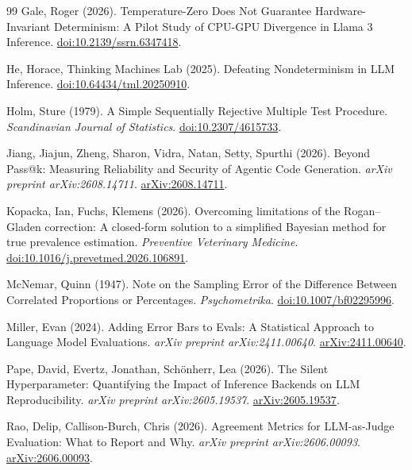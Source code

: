 \documentclass[11pt,letterpaper]{article}
\begin{document}
\begin{thebibliography}{99}
Gale, Roger (2026).
\newblock Temperature-Zero Does Not Guarantee Hardware-Invariant Determinism: A Pilot Study of CPU-GPU Divergence in Llama 3 Inference.
\newblock \href{https://doi.org/10.2139/ssrn.6347418}{doi:10.2139/ssrn.6347418}.

He, Horace, Thinking Machines Lab (2025).
\newblock Defeating Nondeterminism in LLM Inference.
\newblock \href{https://doi.org/10.64434/tml.20250910}{doi:10.64434/tml.20250910}.

Holm, Sture (1979).
\newblock A Simple Sequentially Rejective Multiple Test Procedure.
\newblock \emph{Scandinavian Journal of Statistics}.
\newblock \href{https://doi.org/10.2307/4615733}{doi:10.2307/4615733}.

Jiang, Jiajun, Zheng, Sharon, Vidra, Natan, Setty, Spurthi (2026).
\newblock Beyond Pass@k: Measuring Reliability and Security of Agentic Code Generation.
\newblock \emph{arXiv preprint arXiv:2608.14711}.
\newblock \href{https://arxiv.org/abs/2608.14711}{arXiv:2608.14711}.

Kopacka, Ian, Fuchs, Klemens (2026).
\newblock Overcoming limitations of the Rogan–Gladen correction: A closed-form solution to a simplified Bayesian method for true prevalence estimation.
\newblock \emph{Preventive Veterinary Medicine}.
\newblock \href{https://doi.org/10.1016/j.prevetmed.2026.106891}{doi:10.1016/j.prevetmed.2026.106891}.

McNemar, Quinn (1947).
\newblock Note on the Sampling Error of the Difference Between Correlated Proportions or Percentages.
\newblock \emph{Psychometrika}.
\newblock \href{https://doi.org/10.1007/bf02295996}{doi:10.1007/bf02295996}.

Miller, Evan (2024).
\newblock Adding Error Bars to Evals: A Statistical Approach to Language Model Evaluations.
\newblock \emph{arXiv preprint arXiv:2411.00640}.
\newblock \href{https://arxiv.org/abs/2411.00640}{arXiv:2411.00640}.

Pape, David, Evertz, Jonathan, Schönherr, Lea (2026).
\newblock The Silent Hyperparameter: Quantifying the Impact of Inference Backends on LLM Reproducibility.
\newblock \emph{arXiv preprint arXiv:2605.19537}.
\newblock \href{https://arxiv.org/abs/2605.19537}{arXiv:2605.19537}.

Rao, Delip, Callison-Burch, Chris (2026).
\newblock Agreement Metrics for LLM-as-Judge Evaluation: What to Report and Why.
\newblock \emph{arXiv preprint arXiv:2606.00093}.
\newblock \href{https://arxiv.org/abs/2606.00093}{arXiv:2606.00093}.


\end{thebibliography}
\end{document}
